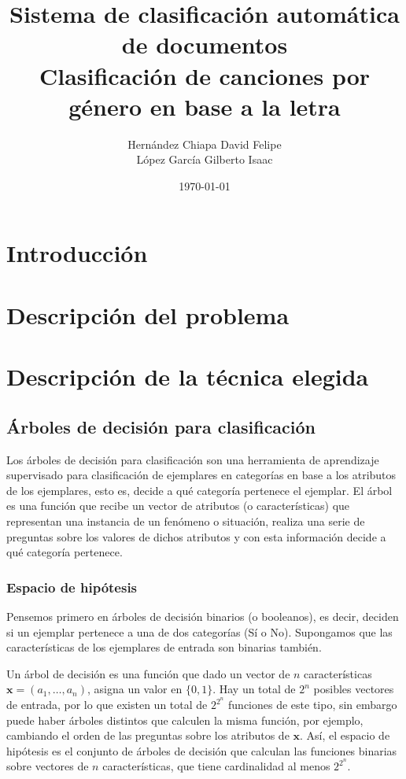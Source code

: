 \documentclass[spanish,11pt,letterpaper]{article}
\title{Sistema de clasificación automática de documentos\\
Clasificación de canciones por género en base a la letra}
\author{Hernández Chiapa David Felipe\\
López García Gilberto Isaac}
\affil{Facultad de Ciencias\\{\small Universidad Nacional Autónoma de México}}
\date{\small\today}
\renewcommand{\vec}[1]{\mathbf{#1}}
\begin{document}
\maketitle

\section{Introducción}

\section{Descripción del problema}

\section{Descripción de la técnica elegida}

\subsection{Árboles de decisión para clasificación}

Los árboles de decisión para clasificación son una herramienta de aprendizaje
supervisado para clasificación de ejemplares en categorías en base a los
atributos de los ejemplares, esto es, decide a qué categoría pertenece el
ejemplar. El árbol es una función que recibe un vector de atributos (o características) que
representan una instancia de un fenómeno o situación, realiza una serie de
preguntas sobre los valores de dichos atributos y con esta información
decide a qué categoría pertenece.

\subsubsection{Espacio de hipótesis}

Pensemos primero en árboles de decisión binarios (o booleanos), es decir, deciden si un ejemplar
pertenece a una de dos categorías (Sí o No). Supongamos que las características
de los ejemplares de entrada son binarias también.

Un árbol de decisión es una
función que dado un vector de $n$ características $\vec{x} = (a_1,\ldots,a_n)$,
asigna un valor en $\{0,1\}$. Hay un total de $2^n$ posibles vectores de entrada,
por lo que existen un total de $2^{2^n}$ funciones de este tipo, sin embargo puede
haber árboles distintos que calculen la misma función, por ejemplo, cambiando el
orden de las preguntas sobre los atributos de $\vec{x}$. Así, el
espacio de hipótesis es el conjunto de árboles de decisión que calculan
las funciones binarias sobre vectores de $n$ características, que tiene cardinalidad
al menos $2^{2^n}$.
\end{document}
